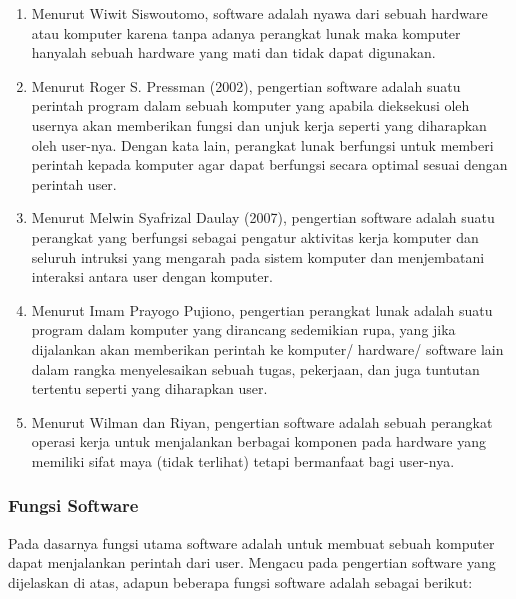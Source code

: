 \begin{enumerate}
\item Menurut Wiwit Siswoutomo, software adalah nyawa dari sebuah hardware atau komputer karena tanpa adanya perangkat lunak maka komputer hanyalah sebuah hardware yang mati dan tidak dapat digunakan.

\item Menurut Roger S. Pressman (2002), pengertian software adalah suatu perintah program dalam sebuah komputer yang apabila dieksekusi oleh usernya akan memberikan fungsi dan unjuk kerja seperti yang diharapkan oleh user-nya. Dengan kata lain, perangkat lunak berfungsi untuk memberi perintah kepada komputer agar dapat berfungsi secara optimal sesuai dengan perintah user.

\item Menurut Melwin Syafrizal Daulay (2007), pengertian software adalah suatu perangkat yang berfungsi sebagai pengatur aktivitas kerja komputer dan seluruh intruksi yang mengarah pada sistem komputer dan menjembatani interaksi antara user dengan komputer.

\item Menurut Imam Prayogo Pujiono, pengertian perangkat lunak adalah suatu program dalam komputer yang dirancang sedemikian rupa, yang jika dijalankan akan memberikan perintah ke komputer/ hardware/ software lain dalam rangka menyelesaikan sebuah tugas, pekerjaan, dan juga tuntutan tertentu seperti yang diharapkan user.

\item Menurut Wilman dan Riyan, pengertian software adalah sebuah perangkat operasi kerja untuk menjalankan berbagai komponen pada hardware yang memiliki sifat maya (tidak terlihat) tetapi bermanfaat bagi user-nya.
\end{enumerate}

\subsubsection{Fungsi Software}

Pada dasarnya fungsi utama software adalah untuk membuat sebuah komputer dapat menjalankan perintah dari user. Mengacu pada pengertian software yang dijelaskan di atas, adapun beberapa fungsi software adalah sebagai berikut:

